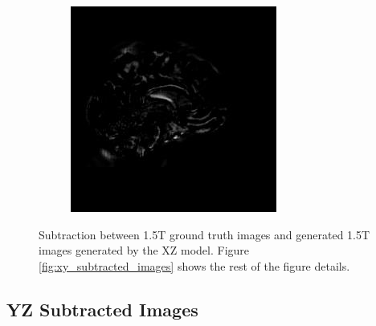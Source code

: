 \documentclass[12pt, fleqn, titlepage]{article}
\newcommand\skipperer{0.45pt}
\newcommand{\1}[1]{\mathds{1}\left[#1\right]}
\begin{document}
\begin{figure}[H]
\begin{subfigure}[b]{0.8\textwidth}
		\hskip\skipperer
		\includegraphics[width=0.22\linewidth]{imgs/subtracted_images/xz/136_S_0196_yz_1.5_1.5gen_comparison}
	\end{subfigure}
	\caption{Subtraction between 1.5T ground truth images and generated 1.5T images generated by the XZ model. Figure \ref{fig:xy_subtracted_images} shows the rest of the figure details.}
	\label{fig:xz_subtracted_images}
\end{figure}

\subsection{YZ Subtracted Images}\label{yz_subtracted_images}
\end{document}
